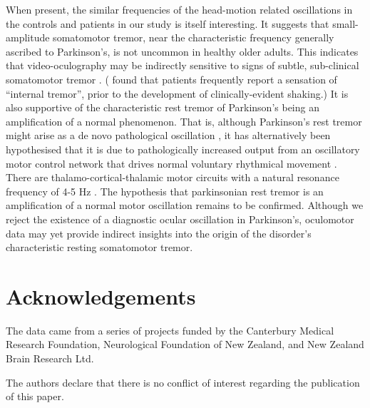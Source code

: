 \documentclass[jou,a4paper]{apa6}
\begin{document}
When present, the similar frequencies of the head-motion related oscillations in the controls and patients in our study is itself interesting. It suggests that small-amplitude somatomotor tremor, near the characteristic frequency generally ascribed to Parkinson's, is not uncommon in healthy older adults. This indicates that video-oculography may be indirectly sensitive to signs of subtle, sub-clinical somatomotor tremor \citep{MacAskill2013Ocular-Tremor-i}.  (\citet{Shulman1996Internal-tremor} found that patients frequently report a sensation of ``internal tremor'', prior to the development of clinically-evident shaking.)  It is also supportive of the characteristic rest tremor of Parkinson's being an amplification of a normal phenomenon. That is, although Parkinson's rest tremor might arise as a de novo pathological oscillation \citep{McAuley2000Physiological-a}, it has alternatively been hypothesised that it is due to pathologically increased output from an oscillatory motor control network that drives normal voluntary rhythmical movement \citep{Burkhard:NeurophysiolClin:2002,Schnitzler2005Normal-and-path,Schnitzler2006Physiological-a}. There are thalamo-cortical-thalamic motor circuits with a natural resonance frequency of 4-5 Hz \citep{Volkmann:Neurology:1996}. The hypothesis that parkinsonian rest tremor is an amplification of a normal motor oscillation remains to be confirmed. Although we reject the existence of a diagnostic ocular oscillation in Parkinson's, oculomotor data may yet provide indirect insights into the origin of the disorder's characteristic resting somatomotor tremor.


\section{Acknowledgements}
The data came from a series of projects funded by the Canterbury Medical Research Foundation, Neurological Foundation of New Zealand, and New Zealand Brain Research Ltd.

The authors declare that there is no conflict of interest regarding the
publication of this paper.


\end{document}
